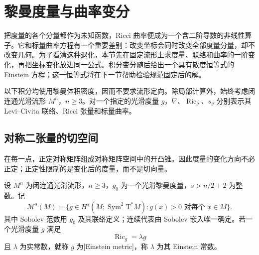 
% 
% 

\section{黎曼度量与曲率变分}
\label{g3:sec:2501}

把度量的各个分量都作为未知函数，Ricci 曲率便成为一个含二阶导数的非线性算子。它和标量曲率方程有一个重要差别：改变坐标会同时改变全部度量分量，却不改变几何。为了看清这种退化，本节先在固定流形上求度量、联络和曲率的一阶变化，再把坐标变化放进同一公式。积分变分随后给出一个具有散度恒等式的 Einstein 方程；这一恒等式将在下一节帮助检验规范固定后的解。

以下积分均使用黎曼体积密度，因而不要求流形定向。除局部计算外，始终考虑闭连通光滑流形 \(M^n\)，\(n\ge3\)。对一个指定的光滑度量 \(g\)，\(\nabla\)、\(\operatorname{Ric}_g\)、\(s_g\) 分别表示其 Levi--Civita 联络、Ricci 张量和标量曲率。

\subsection{对称二张量的切空间}
\label{g3:subsec:2501:01}
在每一点，正定对称矩阵组成对称矩阵空间中的开凸锥。因此度量的变化方向不必正定；正定性限制的是变化后的度量，而不是切向量。

\begin{definition}\label{g3:def:einstein-metric-space}
	设 \(M^n\) 为闭连通光滑流形，\(n\ge3\)，\(g_0\) 为一个光滑黎曼度量，\(s>n/2+2\) 为整数。记
	\[
		\mathcal M^s(M)=\{g\in H^s(M;\operatorname{Sym}^2\mathrm T^*M):g(x)>0\text{ 对每个 }x\in M\}.
	\]
	其中 Sobolev 范数用 \(g_0\) 及其联络定义；连续代表由 Sobolev 嵌入唯一确定。若一个光滑度量 \(g\) 满足
	\begin{equation}\label{g3:eq:einstein-equation-fixed-lambda}
		\operatorname{Ric}_g=\lambda g
	\end{equation}
	且 \(\lambda\) 为实常数，就称 \(g\) 为[Einstein metric]，称 \(\lambda\) 为其 Einstein 常数。
\end{definition}

